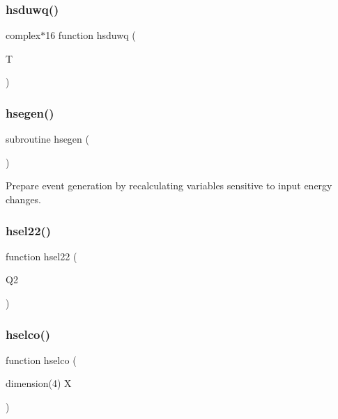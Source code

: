 \mbox{\label{djangoh__h_8f_a57691fd114f710060efd3c5ef1fc0a45}} 
\subsubsection{\texorpdfstring{hsduwq()}{hsduwq()}}
{\footnotesize\ttfamily complex$\ast$16 function hsduwq (\begin{DoxyParamCaption}\item[{}]{T }\end{DoxyParamCaption})}

\mbox{\label{djangoh__h_8f_a2052ebc990554aca26866de7caeaf317}} 
\subsubsection{\texorpdfstring{hsegen()}{hsegen()}}
{\footnotesize\ttfamily subroutine hsegen (\begin{DoxyParamCaption}{ }\end{DoxyParamCaption})}



Prepare event generation by recalculating variables sensitive to input energy changes. 

\mbox{\label{djangoh__h_8f_a444405a7ca832443f03f235ab4efea18}} 
\subsubsection{\texorpdfstring{hsel22()}{hsel22()}}
{\footnotesize\ttfamily function hsel22 (\begin{DoxyParamCaption}\item[{}]{Q2 }\end{DoxyParamCaption})}

\mbox{\label{djangoh__h_8f_a97c6a1c094567f2b4a4bd8e79ce664eb}} 
\subsubsection{\texorpdfstring{hselco()}{hselco()}}
{\footnotesize\ttfamily function hselco (\begin{DoxyParamCaption}\item[{dimension(4)}]{X }\end{DoxyParamCaption})}

